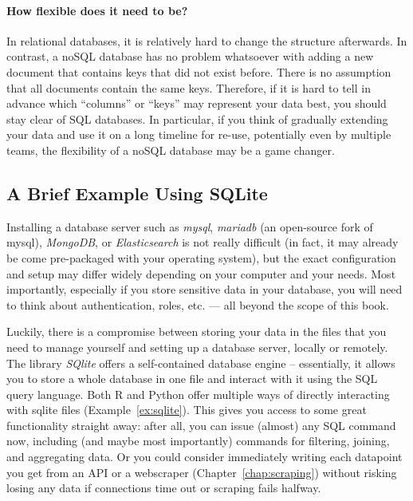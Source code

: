\paragraph[How flexible does it need to be?]{How flexible does it need to be?}
In relational databases, it is relatively hard to change the structure afterwards. In contrast, a noSQL database has no problem whatsoever with adding a new document that contains keys that did not exist before. There is no assumption that all documents contain the same keys. Therefore, if it is hard to tell in advance which ``columns'' or ``keys'' may represent your data best, you should stay clear of SQL databases. In particular, if you think of gradually extending your data and use it on a long timeline for re-use, potentially even by multiple teams, the flexibility of a noSQL database may be a game changer.



\subsection{A Brief Example Using SQLite}\label{sec:sqlite}

Installing a database server such as \emph{mysql}, \emph{mariadb} (an
open-source fork of mysql), \emph{MongoDB}, or \emph{Elasticsearch} is
not really difficult (in fact, it may already be come pre-packaged
with your operating system), but the exact configuration and setup may
differ widely depending on your computer and your needs. Most
importantly, especially if you store sensitive data in your database,
you will need to think about authentication, roles, etc. --- all
beyond the scope of this book.

Luckily, there is a compromise between storing your data in the files
that you need to manage yourself and setting up a database server,
locally or remotely. The library \emph{SQlite} offers a self-contained
database engine -- essentially, it allows you to store a whole
database in one file and interact with it using the SQL query language.
Both R and Python offer multiple ways of directly interacting with
sqlite files (Example~\ref{ex:sqlite}). This gives you access to some great
functionality straight away: after all, you can issue (almost) any SQL command
now, including (and maybe most importantly) commands for filtering,
joining, and aggregating data. Or you could consider immediately writing
each datapoint you get from an API or a webscraper (Chapter~\ref{chap:scraping})
without risking  losing any data if connections time out or scraping
fails halfway.


